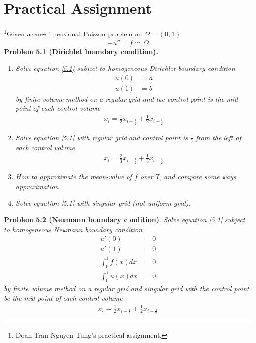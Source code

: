 \documentclass[a4paper]{article}
\numberwithin{equation}{section}
\begin{document}
\section{Practical Assignment}
\footnote{Doan Tran Nguyen Tung's practical assignment.}Given a one-dimensional Poisson problem on $\Omega =\left(0,1\right)$
\begin{align}
\label{5.1}
- u'' = f\mbox{ in } \Omega 
\end{align}
\textbf{Problem 5.1 (Dirichlet boundary condition).} 
\begin{enumerate}
\item \textit{Solve equation \eqref{5.1} subject to homogeneous Dirichlet boundary condition}
\begin{align}
u\left( 0 \right) &= a\\
u\left( 1 \right) &= b
\end{align}
\textit{by finite volume method on a regular grid and the control point is the mid point of each control volume}
\begin{align}
{x_i} = \frac{1}{2}{x_{i - \frac{1}{2}}} + \frac{1}{2}{x_{i + \frac{1}{2}}}
\end{align}
\item \textit{Solve equation \eqref{5.1} with regular grid and control point is $\frac{1}{3}$ from the left of each control volume}
\begin{align}
{x_i} = \frac{2}{3}{x_{i - \frac{1}{2}}} + \frac{1}{3}{x_{i + \frac{1}{2}}}
\end{align}
\item \textit{How to approximate the mean-value of $f$ over $T_i$ and compare some ways approximation.}
\item \textit{Solve equation \eqref{5.1} with singular grid (not uniform grid).}
\end{enumerate} 
\textbf{Problem 5.2 (Neumann boundary condition).} \textit{Solve equation \eqref{5.1} subject to homogeneous Neumann boundary condition}
\begin{align}
u'\left( 0 \right) &= 0\\
u'\left( 1 \right) &= 0\\
\int_0^1 {f\left( x \right)dx}  &= 0\\
\int_0^1 {u\left( x \right)dx}  &= 0
\end{align}
\textit{by finite volume method on a regular grid and singular grid with the control point be the mid point of each control volume}
\begin{align}
{x_i} = \frac{1}{2}{x_{i - \frac{1}{2}}} + \frac{1}{2}{x_{i + \frac{1}{2}}}
\end{align}
\end{document}
